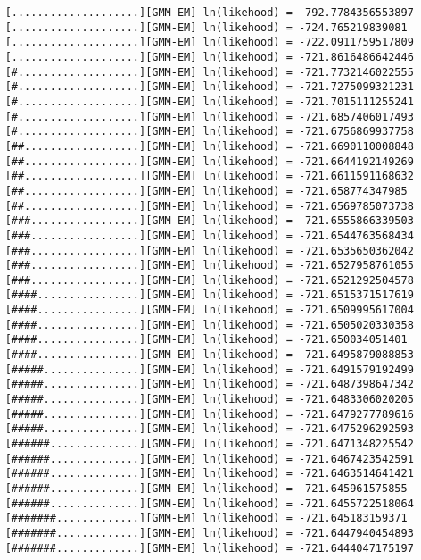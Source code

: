 \begin{verbatim}
    [....................][GMM-EM] ln(likehood) = -792.7784356553897
    [....................][GMM-EM] ln(likehood) = -724.765219839081
    [....................][GMM-EM] ln(likehood) = -722.0911759517809
    [....................][GMM-EM] ln(likehood) = -721.8616486642446
    [#...................][GMM-EM] ln(likehood) = -721.7732146022555
    [#...................][GMM-EM] ln(likehood) = -721.7275099321231
    [#...................][GMM-EM] ln(likehood) = -721.7015111255241
    [#...................][GMM-EM] ln(likehood) = -721.6857406017493
    [#...................][GMM-EM] ln(likehood) = -721.6756869937758
    [##..................][GMM-EM] ln(likehood) = -721.6690110008848
    [##..................][GMM-EM] ln(likehood) = -721.6644192149269
    [##..................][GMM-EM] ln(likehood) = -721.6611591168632
    [##..................][GMM-EM] ln(likehood) = -721.658774347985
    [##..................][GMM-EM] ln(likehood) = -721.6569785073738
    [###.................][GMM-EM] ln(likehood) = -721.6555866339503
    [###.................][GMM-EM] ln(likehood) = -721.6544763568434
    [###.................][GMM-EM] ln(likehood) = -721.6535650362042
    [###.................][GMM-EM] ln(likehood) = -721.6527958761055
    [###.................][GMM-EM] ln(likehood) = -721.6521292504578
    [####................][GMM-EM] ln(likehood) = -721.6515371517619
    [####................][GMM-EM] ln(likehood) = -721.6509995617004
    [####................][GMM-EM] ln(likehood) = -721.6505020330358
    [####................][GMM-EM] ln(likehood) = -721.650034051401
    [####................][GMM-EM] ln(likehood) = -721.6495879088853
    [#####...............][GMM-EM] ln(likehood) = -721.6491579192499
    [#####...............][GMM-EM] ln(likehood) = -721.6487398647342
    [#####...............][GMM-EM] ln(likehood) = -721.6483306020205
    [#####...............][GMM-EM] ln(likehood) = -721.6479277789616
    [#####...............][GMM-EM] ln(likehood) = -721.6475296292593
    [######..............][GMM-EM] ln(likehood) = -721.6471348225542
    [######..............][GMM-EM] ln(likehood) = -721.6467423542591
    [######..............][GMM-EM] ln(likehood) = -721.6463514641421
    [######..............][GMM-EM] ln(likehood) = -721.645961575855
    [######..............][GMM-EM] ln(likehood) = -721.6455722518064
    [#######.............][GMM-EM] ln(likehood) = -721.645183159371
    [#######.............][GMM-EM] ln(likehood) = -721.6447940454893
    [#######.............][GMM-EM] ln(likehood) = -721.6444047175197

\end{verbatim}
